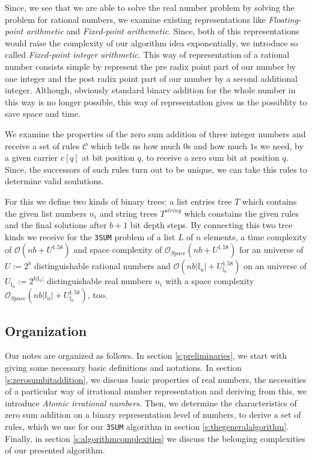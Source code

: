 Since, we see that we are able to solve the real number problem by solving the problem for rational numbers, we examine existing representations like \textit{Floating-point arithmetic} and \textit{Fixed-point arithemetic}. Since, both of this representations would raise the complexity of our algorithm idea exponentially, we introduce so called \textit{Fixed-point integer arithmetic}. This way of representation of a rational number consists simple by represent the pre radix point part of our number by one integer and the post radix point part of our number by a second additional integer. Although, obviously standard binary addition for the whole number in this way is no longer possible, this way of representation gives us the possiblity to save space and time.

We examine the properties of the zero sum addition of three integer numbers and receive a set of rules $\mathcal{C}$ which tells us how much $0$s and how much $1$s we need, by a given carrier $c{[q]}$ at bit position $q$, to receive a zero sum bit at position $q$. Since, the successors of such rules turn out to be unique, we can take this rules to determine valid soulutions.

For this we define two kinds of binary trees: a list entries tree $T$ which contains the given list numbers $n_{i}$ and string trees $T^{string}$ which constains the given rules and the final solutions after $b + 1$ bit depth steps. By connecting this two tree kinds we receive for the \texttt{3SUM} problem of a list $L$ of $n$ elements, a time complexity of $\mathcal{O}\left(nb + U^{1.58}\right)$ and space complexity of $\mathcal{O}_{Space}\left(nb + U^{1.58}\right)$ for an universe of $U := 2^{b}$ distinguishable rational numbers and $\mathcal{O}\left(nb|\mathbb{I}_{a}| + U^{1.58}_{\mathbb{I}_{a}}\right)$ on an universe of $U_{\mathbb{I}_{a}} := 2^{b |\mathbb{I}_{a}|}$ distinguishable real numbers $n_{i}$ with a space complexity $\mathcal{O}_{Space}\left(nb|\mathbb{I}_{a}| + U^{1.58}_{\mathbb{I}_{a}}\right)$, too.
\subsection{Organization}
\label{ss:organization}
Our notes are organized as follows. In section \ref{s:preliminaries}, we start with giving some necessary basic definitions and notations. In section \ref{s:zerosumbitaddition}, we discuss basic properties of real numbers, the necessities of a particular way of irrational number representation and deriving from this, we introduce \textit{Atomic irrational numbers}. Then, we determine the characteristics of zero sum addition on a binary representation level of numbers, to derive a set of rules, which we use for our \texttt{3SUM} algorithm in section \ref{s:thegeneralalgorithm}. Finally, in section \ref{s:algorithmcomplexities} we discuss the belonging complexities of our presented algorithm.
